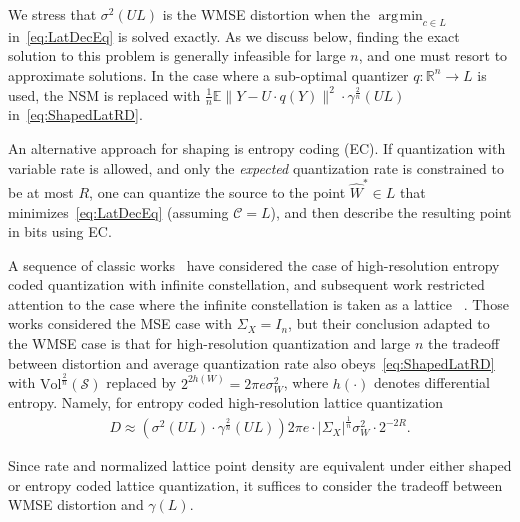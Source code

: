 \documentclass[journal]{IEEEtran}
\newcommand{\RR}{\mathbb{R}}
\newcommand{\Vol}{\mathrm{Vol}}
\def\EE{\mathbb{E}}
\newcommand{\m}{\mathcal}
\newcommand{\covol}{\mathrm{covol}}
\DeclareMathOperator*{\argmin}{\arg\!\min}
\begin{document}
We stress that $\sigma^2(UL)$ is the WMSE distortion when the $\argmin_{c\in L}$ in~\eqref{eq:LatDecEq} is solved exactly. As we discuss below, finding the exact solution to this problem is generally infeasible for large $n$, and one must resort to approximate solutions. In the case where a sub-optimal quantizer $q:\RR^n\to L$ is used, the NSM is replaced with $\frac{1}{n}\EE\|Y-U\cdot q(Y)\|^2\cdot \gamma^{\frac{2}{n}}(UL)$ in~\eqref{eq:ShapedLatRD}.


An alternative approach for shaping is entropy coding (EC). If quantization with variable rate is allowed, and only the \emph{expected} quantization rate is constrained to be at most $R$, one can quantize the source to the point $\hat{W}^*\in L$ that minimizes~\eqref{eq:LatDecEq} (assuming $\m{C}=L$), and then describe the resulting point in bits using EC.

A sequence of classic works~\cite{bennett1948spectra,panter1951quantization,zador1982asymptotic,gersho79} have considered the case of high-resolution entropy coded quantization with infinite constellation, and subsequent work restricted attention to the case where the infinite constellation is taken as a lattice ~\cite{eyuboglu1993lattice,zamir1996lattice,ramiBook}. Those works considered the MSE case with $\Sigma_X=I_n$, but their conclusion adapted to the WMSE case is that for high-resolution quantization and large $n$ the tradeoff between distortion and average quantization rate also obeys~\eqref{eq:ShapedLatRD} with $\Vol^{\frac{2}{n}}(\m{S})$ replaced by $2^{2h(W)}=2\pi e\sigma_W^2$, where $h(\cdot)$ denotes differential entropy. Namely, for entropy coded high-resolution lattice quantization
\begin{align}
D\approx \left(\sigma^2(UL)\cdot \gamma^{\frac{2}{n}}(UL)\right) 2\pi e\cdot|\Sigma_X|^{\frac{1}{n}}\sigma_W^2\cdot 2^{-2R}.
\label{eq:ecdqRD}
\end{align}


Since rate and normalized lattice point density are equivalent under either shaped or entropy coded lattice quantization, it suffices to consider the tradeoff between WMSE distortion and $\gamma(L)$.

\end{document}
